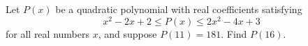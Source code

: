Let $ P(x)$ be a quadratic polynomial with real coefficients satisfying \[x^2 - 2x + 2 \le P(x) \le 2x^2 - 4x + 3\]for all real  numbers $ x$, and suppose $ P(11) = 181$. Find $ P(16)$.